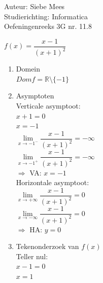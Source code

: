 \documentclass[a4paper]{article}
\begin{document}
  
\noindent \large Auteur: Siebe Mees \\
\noindent \large Studierichting: Informatica\\
\noindent \large Oefeningenreeks 3G nr. 11.8\\

\medskip

\normalsize

$f(x)=\dfrac{x-1}{(x+1)^2}$\\

\begin{enumerate}

\item Domein\\

$Dom f=\mathbb{R}\setminus\{-1\}$\\


\item Asymptoten\\

Verticale asymptoot:\\

$x+1=0$\\

$x=-1$\\

$\lim\limits_{x \rightarrow -1^-}\dfrac{x-1}{(x+1)^2}=-\infty$\\

$\lim\limits_{x \rightarrow -1^+}\dfrac{x-1}{(x+1)^2}=-\infty$\\

$\Rightarrow$ VA: $x=-1$\\


Horizontale asymptoot:\\

$\lim\limits_{x \rightarrow +\infty}\dfrac{x-1}{(x+1)^2}=0$\\

$\lim\limits_{x \rightarrow -\infty}\dfrac{x-1}{(x+1)^2}=0$\\

$\Rightarrow$ HA: $y=0$\\


\item Tekenonderzoek van $f(x)$\\

Teller nul:\\

$x-1=0$\\

$x=1$\\


\end{enumerate}
\end{document}
